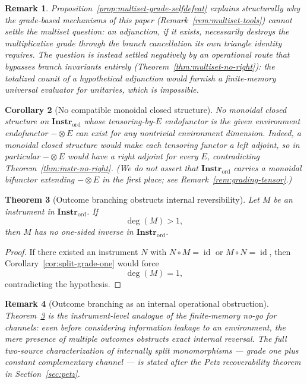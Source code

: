 \documentclass[11pt]{article}
\newtheorem{theorem}{Theorem}[section]
\newtheorem{corollary}[theorem]{Corollary}
\newtheorem{remark}[theorem]{Remark}
\DeclareMathOperator{\id}{id}
\begin{document}
\begin{remark}
Proposition~\ref{prop:multiset-grade-selfdefeat} explains structurally why the
grade-based mechanisms of this paper (Remark~\ref{rem:multiset-tools}) cannot
settle the multiset question: an adjunction, if it exists, necessarily destroys
the multiplicative grade through the branch cancellation its own triangle
identity requires. The question is instead settled negatively by an operational
route that bypasses branch invariants entirely
(Theorem~\ref{thm:multiset-no-right}): the totalized counit of a hypothetical
adjunction would furnish a finite-memory universal evaluator for unitaries,
which is impossible.
\end{remark}

\begin{corollary}[No compatible monoidal closed structure]
\label{cor:instr-not-closed}
No monoidal closed structure on $\mathbf{Instr}_{\mathrm{ord}}$ whose
tensoring-by-$E$ endofunctor is the given environment endofunctor
$-\otimes E$ can exist for any nontrivial environment dimension. Indeed, a
monoidal closed structure would make each tensoring functor a left adjoint,
so in particular $-\otimes E$ would have a right adjoint for every $E$,
contradicting Theorem~\ref{thm:instr-no-right}. (We do not assert that
$\mathbf{Instr}_{\mathrm{ord}}$ carries a monoidal bifunctor extending
$-\otimes E$ in the first place; see Remark~\ref{rem:grading-tensor}.)
\end{corollary}

\begin{theorem}[Outcome branching obstructs internal reversibility]
\label{thm:outcome-branching-obstruction}
Let $M$ be an instrument in $\mathbf{Instr}_{\mathrm{ord}}$. If
\[
\deg(M)>1,
\]
then $M$ has no one-sided inverse in $\mathbf{Instr}_{\mathrm{ord}}$.
\end{theorem}

\begin{proof}
If there existed an instrument $N$ with $N\circ M=\id$ or
$M\circ N=\id$, then Corollary~\ref{cor:split-grade-one} would force
\[
\deg(M)=1,
\]
contradicting the hypothesis.
\end{proof}

\begin{remark}[Outcome branching as an internal operational obstruction]
\label{rem:outcome-branching-operational}
Theorem~\ref{thm:outcome-branching-obstruction} is the instrument-level
analogue of the finite-memory no-go for channels: even before considering
information leakage to an environment, the mere presence of multiple
outcomes obstructs exact internal reversal. The full two-source
characterization of internally split monomorphisms --- grade one plus
constant complementary channel --- is stated after the Petz recoverability
theorem in Section~\ref{sec:petz}.
\end{remark}
\end{document}
